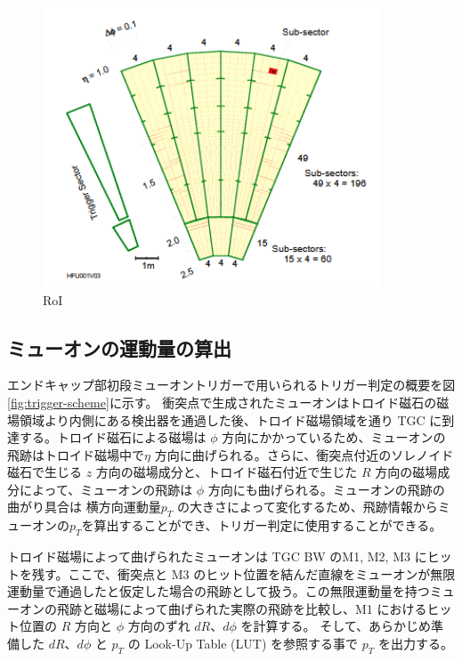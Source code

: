 \begin{figure}[tb]
  \centering
  \includegraphics[clip, width=10cm]{fig/3/RoI.png}
  \caption{RoI}
  \label{fig:RoI}
\end{figure}


\subsection{ミューオンの運動量の算出}
エンドキャップ部初段ミューオントリガーで用いられるトリガー判定の概要を図\ref{fig:trigger-scheme}に示す。
衝突点で生成されたミューオンはトロイド磁石の磁場領域より内側にある検出器を通過した後、トロイド磁場領域を通り TGC に到達する。トロイド磁石による磁場は $\phi$ 方向にかかっているため、ミューオンの飛跡はトロイド磁場中で$\eta$ 方向に曲げられる。さらに、衝突点付近のソレノイド磁石で生じる $z$ 方向の磁場成分と、トロイド磁石付近で生じた $R$ 方向の磁場成分によって、ミューオンの飛跡は $\phi$ 方向にも曲げられる。ミューオンの飛跡の曲がり具合は 横方向運動量$p_T$ の大きさによって変化するため、飛跡情報からミューオンの$p_T$を算出することができ、トリガー判定に使用することができる。

トロイド磁場によって曲げられたミューオンは TGC BW のM1, M2, M3 にヒットを残す。ここで、衝突点と M3 のヒット位置を結んだ直線をミューオンが無限運動量で通過したと仮定した場合の飛跡として扱う。この無限運動量を持つミューオンの飛跡と磁場によって曲げられた実際の飛跡を比較し、M1 におけるヒット位置の $R$ 方向と $\phi$ 方向のずれ $dR$、$d\phi$ を計算する。
そして、あらかじめ準備した $dR$、$d\phi$ と $p_T$ の Look-Up Table (LUT) を参照する事で $p_T$ を出力する。


